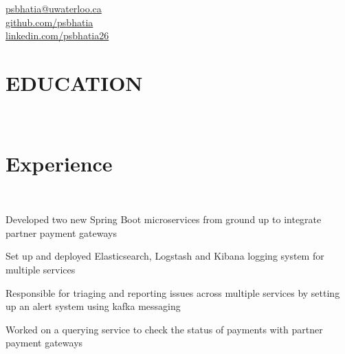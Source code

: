 \documentclass[]{hieudo-build}
\begin{document}
%
%
\color{myyellow}
{
	\color{myblue}\faEnvelope \href{mailto:psbhatia@uwaterloo.ca}{ psbhatia@uwaterloo.ca}\\
	\faGithub \href{https://github.com/psbhatia}{   github.com/psbhatia}\\
	\faLinkedinSquare \href{https://www.linkedin.com/in/psbhatia26}{   linkedin.com/psbhatia26}
}

\begin{minipage}[t]{1.0\textwidth} 

\section{EDUCATION}
\\
\color{myyellow}
\vspace{0.9em} %



\section{Experience}

\\
\color{myyellow}
\vspace{0.9em} %
\begin{tightemize}
\item Developed two new Spring Boot microservices from ground up to integrate partner payment gateways 
\item Set up and deployed Elasticsearch, Logstash and Kibana logging system for multiple services
\item Responsible for triaging and reporting issues across multiple services by setting up an alert system using kafka messaging
\item Worked on a querying service to check the status of payments with partner payment gateways
\end{tightemize}
\sectionsep


\end{minipage}
\end{document}
